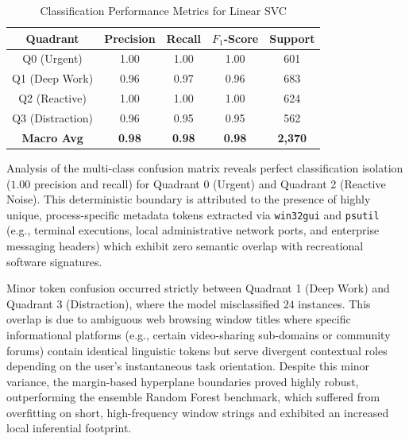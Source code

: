 \documentclass[conference]{IEEEtran}
\begin{document}
\begin{table}[htbp]
\caption{Classification Performance Metrics for Linear SVC}
\label{tab:model_metrics}
\begin{center}
\begin{tabular}{ccccc}
\hline
\textbf{Quadrant} & \textbf{Precision} & \textbf{Recall} & \textbf{\(F_1\)-Score} & \textbf{Support} \\ \hline
Q0 (Urgent)       & 1.00               & 1.00            & 1.00                  & 601              \\ 
Q1 (Deep Work)    & 0.96               & 0.97            & 0.96                  & 683              \\ 
Q2 (Reactive)     & 1.00               & 1.00            & 1.00                  & 624              \\ 
Q3 (Distraction)  & 0.96               & 0.95            & 0.95                  & 562              \\ \hline
\textbf{Macro Avg}& \textbf{0.98}      & \textbf{0.98}   & \textbf{0.98}         & \textbf{2,370}   \\ \hline
\end{tabular}
\end{center}
\end{table}

Analysis of the multi-class confusion matrix reveals perfect classification isolation (\(1.00\) precision and recall) for Quadrant 0 (Urgent) and Quadrant 2 (Reactive Noise). This deterministic boundary is attributed to the presence of highly unique, process-specific metadata tokens extracted via \texttt{win32gui} and \texttt{psutil} (e.g., terminal executions, local administrative network ports, and enterprise messaging headers) which exhibit zero semantic overlap with recreational software signatures. 

Minor token confusion occurred strictly between Quadrant 1 (Deep Work) and Quadrant 3 (Distraction), where the model misclassified $24$ instances. This overlap is due to ambiguous web browsing window titles where specific informational platforms (e.g., certain video-sharing sub-domains or community forums) contain identical linguistic tokens but serve divergent contextual roles depending on the user's instantaneous task orientation. Despite this minor variance, the margin-based hyperplane boundaries proved highly robust, outperforming the ensemble Random Forest benchmark, which suffered from overfitting on short, high-frequency window strings and exhibited an increased local inferential footprint.
\end{document}
